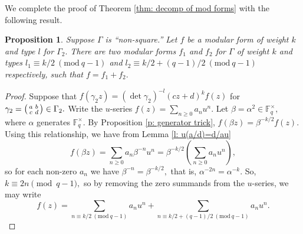 \documentclass[11pt]{amsart}
\newtheorem{proposition}[theorem]{Proposition}
\theoremstyle{definition}
\newenvironment{psmallmatrix}
{\left(\begin{smallmatrix}}
	{\end{smallmatrix}\right)}
\numberwithin{equation}{section}
\newcommand{\bbF}{\mathbb{F}}		%
\newcommand{\jesse}[1]{{\color{blue} \sf $\spadesuit\spadesuit\spadesuit$ Jesse: [#1]}} %
\newcommand{\Mod}[1]{\ (\mathrm{mod}\ #1)}
\begin{document}
We complete the proof of Theorem \ref{thm: decomp of mod forms} with the following result.
\begin{proposition}
	Suppose $\Gamma$ is ``non-square.''
	Let $f$ be a modular form of weight $k$ and type $l$ for $\Gamma_2.$ 
	There are two modular forms $f_1$ and $f_2$ for $\Gamma$ of weight $k$ and types $l_1\equiv k/2\Mod{q-1}$ and $l_2\equiv k/2+(q-1)/2\Mod{q-1}$ respectively, such that $f=f_1+f_2.$
\end{proposition}
\begin{proof}
Suppose that $f(\gamma_2 z)=(\det\gamma_2)^{-l}(cz+d)^kf(z)$ for $\displaystyle{\gamma_2=\begin{psmallmatrix}a&b\\c&d\end{psmallmatrix}\in \Gamma_2}.$ 
Write the $u$-series $f(z)=\sum_{n\geq 0}a_nu^n.$ Let $\beta = \alpha^2\in \bbF_q^{\times},$ where $\alpha$ generates $\bbF_q^{\times}.$ By Proposition \ref{p: generator trick}, $f(\beta z)=\beta^{-k/2}f(z).$ Using this relationship, we have from Lemma \ref{l: u(a/d)=d/au}
\[f(\beta z)= \sum_{n\geq 0}a_n\beta^{-n}u^n = \beta^{-k/2}\left(\sum_{n\geq 0}a_nu^n\right), \] so for each non-zero $a_n$ we have $\beta^{-n}=\beta^{-k/2},$ that is, $\alpha^{-2n}=\alpha^{-k}.$ So, $k\equiv 2n\pmod{q-1},$ so by removing the zero summands from the $u$-series, we may write
\[f(z)=\sum_{n\equiv k/2\Mod{q-1}}a_nu^n+\sum_{n\equiv k/2+(q-1)/2\Mod{q-1}} a_nu^n. \]



\end{proof}
\end{document}
